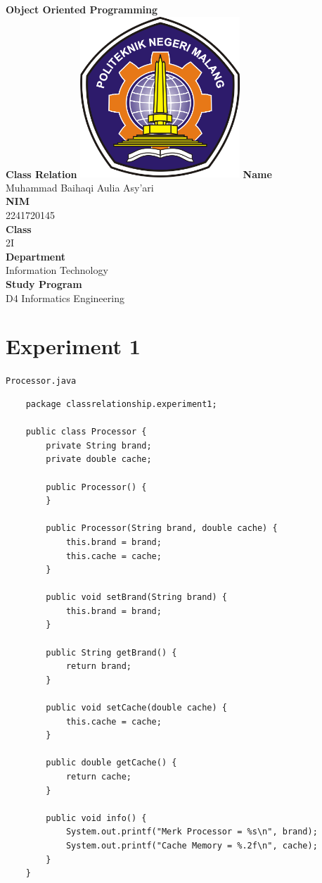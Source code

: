 \documentclass[12pt,titlepage]{article}
\newcommand{\vSubject}{Object Oriented Programming}
\newcommand{\vSubtitle}{Class Relation}
\newcommand{\vName}{Muhammad Baihaqi Aulia Asy'ari}
\newcommand{\vNIM}{2241720145}
\newcommand{\vClass}{2I}
\newcommand{\vDepartment}{Information Technology}
\newcommand{\vStudyProgram}{D4 Informatics Engineering}
\begin{document}
\begin{titlepage}
    \centering
    \vfill
    {\bfseries\LARGE
        \vSubject\\
        \vskip0.25cm
        \vSubtitle
    }
    \vfill
    \includegraphics[width=6cm]{images/polinema-logo.png}
    \vfill
    {
        \textbf{Name}\\
        \vName\\
        \vskip0.5cm
        \textbf{NIM}\\
        \vNIM\\
        \vskip0.5cm
        \textbf{Class}\\
        \vClass\\
        \vskip0.5cm
        \textbf{Department}\\
        \vDepartment\\
        \vskip0.5cm
        \textbf{Study Program}\\
        \vStudyProgram
    }
\end{titlepage}

\newpage

\tableofcontents

\newpage

\section{Experiment 1}
\noindent \texttt{Processor.java}
\begin{verbatim}
    package classrelationship.experiment1;

    public class Processor {
        private String brand;
        private double cache;

        public Processor() {
        }

        public Processor(String brand, double cache) {
            this.brand = brand;
            this.cache = cache;
        }

        public void setBrand(String brand) {
            this.brand = brand;
        }

        public String getBrand() {
            return brand;
        }

        public void setCache(double cache) {
            this.cache = cache;
        }

        public double getCache() {
            return cache;
        }

        public void info() {
            System.out.printf("Merk Processor = %s\n", brand);
            System.out.printf("Cache Memory = %.2f\n", cache);
        }
    }
\end{verbatim}
\end{document}
